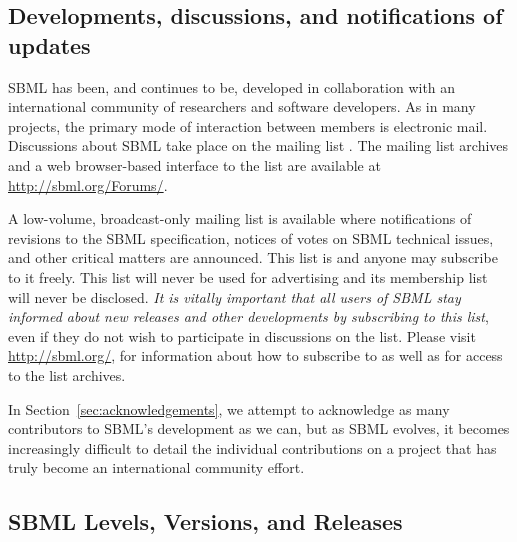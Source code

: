\subsection{Developments, discussions, and notifications of updates}

SBML has been, and continues to be, developed in collaboration
with an international community of researchers and software
developers.  As in many projects, the primary mode of interaction
between members is electronic mail.  Discussions about SBML take
place on the mailing list
.  The
mailing list archives and a web browser-based interface to the
list are available at \url{http://sbml.org/Forums/}.

A low-volume, broadcast-only mailing list is available 
where notifications of
revisions to the SBML speci\-fication, notices of votes on SBML
technical issues, and other critical matters are announced.  This
list is 
and anyone may subscribe to it freely.  This list will never be
used for advertising and its membership list will never be
disclosed.  \emph{It is vitally important that all users of SBML
  stay informed about new releases and other developments by
  subscribing to this list}, even if they do not wish to
participate in discussions on the
 list.
Please visit \url{http://sbml.org/},
for information about how to subscribe to
 as well
as for access to the list archives.

In Section~\ref{sec:acknowledgements}, we attempt to acknowledge
as many contributors to SBML's development as we can, but as SBML
evolves, it becomes increasingly difficult to detail the
individual contributions on a project that has truly become an
international community effort.


\subsection{SBML Levels, Versions, and Releases}
\label{sec:levels-versions-releases}

